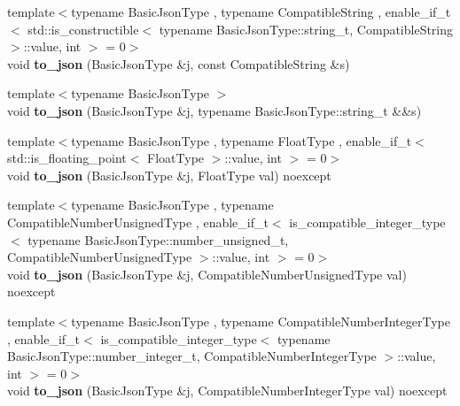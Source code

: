 \begin{DoxyCompactItemize}
\mbox{\label{namespacenlohmann_1_1detail_a7356ed05cdbbb080cee80e1211e1c6c9}} 
{\footnotesize template$<$typename Basic\+Json\+Type , typename Compatible\+String , enable\+\_\+if\+\_\+t$<$ std\+::is\+\_\+constructible$<$ typename Basic\+Json\+Type\+::string\+\_\+t, Compatible\+String $>$\+::value, int $>$  = 0$>$ }\\void {\bfseries to\+\_\+json} (Basic\+Json\+Type \&j, const Compatible\+String \&s)
\item 
\mbox{\label{namespacenlohmann_1_1detail_a4aa1ca6b7c61bf19d1f30ea5b669f68e}} 
{\footnotesize template$<$typename Basic\+Json\+Type $>$ }\\void {\bfseries to\+\_\+json} (Basic\+Json\+Type \&j, typename Basic\+Json\+Type\+::string\+\_\+t \&\&s)
\item 
\mbox{\label{namespacenlohmann_1_1detail_a22bffdc8bc7e43af380ba2050696b230}} 
{\footnotesize template$<$typename Basic\+Json\+Type , typename Float\+Type , enable\+\_\+if\+\_\+t$<$ std\+::is\+\_\+floating\+\_\+point$<$ Float\+Type $>$\+::value, int $>$  = 0$>$ }\\void {\bfseries to\+\_\+json} (Basic\+Json\+Type \&j, Float\+Type val) noexcept
\item 
\mbox{\label{namespacenlohmann_1_1detail_ae5fd66b5517b3b5a6c6b9fd9f29ba8dc}} 
{\footnotesize template$<$typename Basic\+Json\+Type , typename Compatible\+Number\+Unsigned\+Type , enable\+\_\+if\+\_\+t$<$ is\+\_\+compatible\+\_\+integer\+\_\+type$<$ typename Basic\+Json\+Type\+::number\+\_\+unsigned\+\_\+t, Compatible\+Number\+Unsigned\+Type $>$\+::value, int $>$  = 0$>$ }\\void {\bfseries to\+\_\+json} (Basic\+Json\+Type \&j, Compatible\+Number\+Unsigned\+Type val) noexcept
\item 
\mbox{\label{namespacenlohmann_1_1detail_a91fe576be579c8c2fdd14610605c6dd2}} 
{\footnotesize template$<$typename Basic\+Json\+Type , typename Compatible\+Number\+Integer\+Type , enable\+\_\+if\+\_\+t$<$ is\+\_\+compatible\+\_\+integer\+\_\+type$<$ typename Basic\+Json\+Type\+::number\+\_\+integer\+\_\+t, Compatible\+Number\+Integer\+Type $>$\+::value, int $>$  = 0$>$ }\\void {\bfseries to\+\_\+json} (Basic\+Json\+Type \&j, Compatible\+Number\+Integer\+Type val) noexcept

\end{DoxyCompactItemize}
